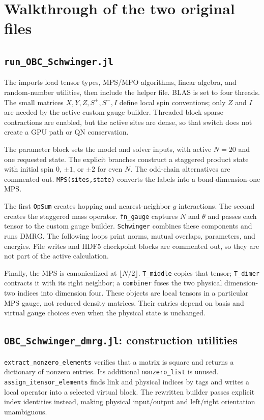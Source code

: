 \documentclass[11pt]{article}
\newcommand{\code}[1]{\nolinkurl{#1}}
\begin{document}
\section{Walkthrough of the two original files}
\subsection{\texttt{run\_OBC\_Schwinger.jl}}
The imports load tensor types, MPS/MPO algorithms, linear algebra, and random-number utilities, then include the helper file. BLAS is set to four threads. The small matrices $X,Y,Z,S^+,S^-,I$ define local spin conventions; only $Z$ and $I$ are needed by the active custom gauge builder. Threaded block-sparse contractions are enabled, but the active sites are dense, so that switch does not create a GPU path or QN conservation.

The parameter block sets the model and solver inputs, with active $N=20$ and one requested state. The explicit branches construct a staggered product state with initial spin 0, $\pm1$, or $\pm2$ for even $N$. The odd-chain alternatives are commented out. \code{MPS(sites,state)} converts the labels into a bond-dimension-one MPS.

The first \code{OpSum} creates hopping and nearest-neighbor $g$ interactions. The second creates the staggered mass operator. \code{fn_gauge} captures $N$ and $\theta$ and passes each tensor to the custom gauge builder. \code{Schwinger} combines these components and runs DMRG. The following loops print norms, mutual overlaps, parameters, and energies. File writes and HDF5 checkpoint blocks are commented out, so they are not part of the active calculation.

Finally, the MPS is canonicalized at $\lfloor N/2\rfloor$. \code{T_middle} copies that tensor; \code{T_dimer} contracts it with its right neighbor; a \code{combiner} fuses the two physical dimension-two indices into dimension four. These objects are local tensors in a particular MPS gauge, not reduced density matrices. Their entries depend on basis and virtual gauge choices even when the physical state is unchanged.

\subsection{\texttt{OBC\_Schwinger\_dmrg.jl}: construction utilities}
\code{extract_nonzero_elements} verifies that a matrix is square and returns a dictionary of nonzero entries. Its additional \code{nonzero_list} is unused. \code{assign_itensor_elements} finds link and physical indices by tags and writes a local operator into a selected virtual block. The rewritten builder passes explicit index identities instead, making physical input/output and left/right orientation unambiguous.
\end{document}

